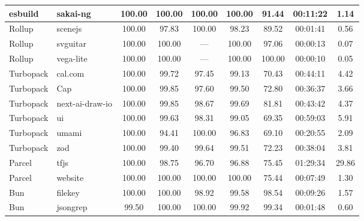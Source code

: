 \begin{longtable}{@{}l>{\raggedright\arraybackslash}p{25mm}ccccccc@{}}
esbuild & sakai-\allowbreak ng & 100.00 & 100.00 & 100.00 & 100.00 & 91.44 & 00:11:22 & 1.14 \\
\midrule
Rollup & scenejs & 100.00 & 97.83 & 100.00 & 98.23 & 89.52 & 00:01:41 & 0.56 \\
Rollup & svguitar & 100.00 & 100.00 & --- & 100.00 & 97.06 & 00:00:13 & 0.07 \\
Rollup & vega-\allowbreak lite & 100.00 & 100.00 & --- & 100.00 & 100.00 & 00:00:10 & 0.05 \\
\midrule
Turbopack & cal.com & 100.00 & 99.72 & 97.45 & 99.13 & 70.43 & 00:44:11 & 4.42 \\
Turbopack & Cap & 100.00 & 99.85 & 97.60 & 99.50 & 72.80 & 00:36:37 & 3.66 \\
Turbopack & next-\allowbreak ai-\allowbreak draw-\allowbreak io & 100.00 & 99.85 & 98.67 & 99.69 & 81.81 & 00:43:42 & 4.37 \\
Turbopack & ui & 100.00 & 99.63 & 98.31 & 99.05 & 69.35 & 00:59:03 & 5.91 \\
Turbopack & umami & 100.00 & 94.41 & 100.00 & 96.83 & 69.10 & 00:20:55 & 2.09 \\
Turbopack & zod & 100.00 & 99.40 & 99.64 & 99.51 & 72.23 & 00:38:04 & 3.81 \\
\midrule
Parcel & tfjs & 100.00 & 98.75 & 96.70 & 96.88 & 75.45 & 01:29:34 & 29.86 \\
Parcel & website & 100.00 & 100.00 & 100.00 & 100.00 & 75.44 & 00:07:49 & 1.30 \\
\midrule
Bun & filekey & 100.00 & 100.00 & 98.92 & 99.58 & 98.54 & 00:09:26 & 1.57 \\
Bun & jsongrep & 99.50 & 100.00 & 100.00 & 99.92 & 99.34 & 00:01:48 & 0.60 \\
\end{longtable}\endgroup
